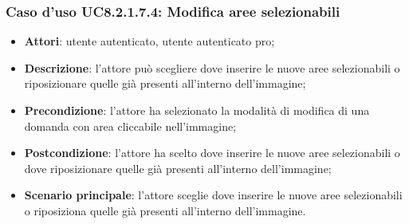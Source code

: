 \subsubsection{Caso d'uso UC8.2.1.7.4: Modifica aree selezionabili}
\begin{itemize}
	\item \textbf{Attori}: utente autenticato, utente autenticato pro;
	\item \textbf{Descrizione}: l'attore può scegliere dove inserire le nuove aree selezionabili o riposizionare quelle già presenti all'interno dell'immagine;
	\item \textbf{Precondizione}: l'attore ha selezionato la modalità di modifica di una domanda con area cliccabile nell'immagine; 
	\item \textbf{Postcondizione}: l'attore ha scelto dove inserire le nuove aree selezionabili o dove riposizionare quelle già presenti all'interno dell'immagine;
	\item \textbf{Scenario principale}: l'attore sceglie dove inserire le nuove aree selezionabili o riposiziona quelle già presenti all'interno dell'immagine. 	
\end{itemize}
